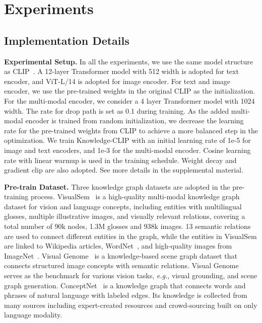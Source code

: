 \section{Experiments}

\label{sec:experi}

\subsection{Implementation Details}
\textbf{Experimental Setup.} In all the experiments, we use the same model structure as CLIP~\cite{clip}. A 12-layer Transformer model with 512 width is adopted for text encoder, and ViT-L/14 is adopted for image encoder. For text and image encoder, we use the pre-trained weights in the original CLIP as the initialization. For the multi-modal encoder, we consider a 4 layer Transformer model with 1024 width. The rate for drop path is set as 0.1 during training. As the added multi-modal encoder is trained from random initialization, we decrease the learning rate for the pre-trained weights from CLIP to achieve a more balanced step in the optimization. We train Knowledge-CLIP with an initial learning rate of 1e-5 for image and text encoders, and 1e-3 for the multi-modal encoder. Cosine learning rate with linear warmup is used in the training schedule. Weight decay and gradient clip are also adopted. See more details in the supplemental material. 

\textbf{Pre-train Dataset.} Three knowledge graph datasets are adopted in the pre-training process. VisualSem~\cite{visualsem} is a high-quality multi-modal knowledge graph dataset for vision and language concepts, including entities with multilingual glosses, multiple illustrative images, and visually relevant relations, covering a total number of 90k nodes, 1.3M glosses and 938k images. 13 semantic relations are used to connect different entities in the graph, while the entities in VisualSem are linked to Wikipedia articles, WordNet~\cite{wordnet}, and high-quality images from ImageNet~\cite{imagenet}. Visual Genome~\cite{vgdata} is a knowledge-based scene graph dataset that connects structured image concepts with semantic relations. Visual Genome serves as the benchmark for various vision tasks, \textit{e.g.}, visual grounding, and scene graph generation. ConceptNet~\cite{conceptnet} is a knowledge graph that connects words and phrases of natural language with labeled edges. Its knowledge is collected from many sources including expert-created resources and crowd-sourcing built on only language modality.

